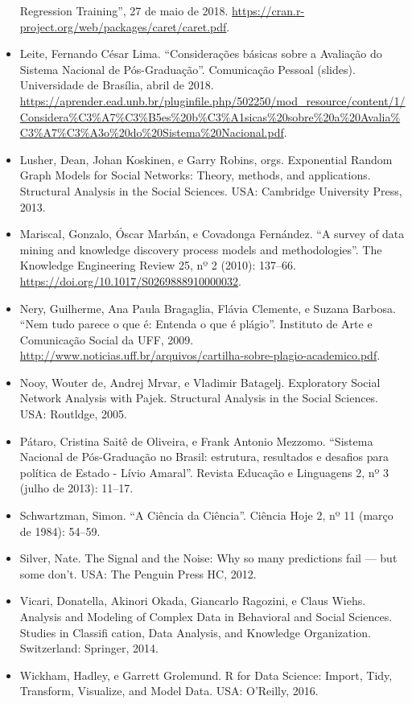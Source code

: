\documentclass[]{article}
\begin{document}
\begin{itemize}
  Regression Training'', 27 de maio de 2018.
  \url{https://cran.r-project.org/web/packages/caret/caret.pdf}.
\item
  Leite, Fernando César Lima. ``Considerações básicas sobre a Avaliação
  do Sistema Nacional de Pós-Graduação''. Comunicação Pessoal (slides).
  Universidade de Brasília, abril de 2018.
  \url{https://aprender.ead.unb.br/pluginfile.php/502250/mod_resource/content/1/Considera\%C3\%A7\%C3\%B5es\%20b\%C3\%A1sicas\%20sobre\%20a\%20Avalia\%C3\%A7\%C3\%A3o\%20do\%20Sistema\%20Nacional.pdf}.
\item
  Lusher, Dean, Johan Koskinen, e Garry Robins, orgs. Exponential Random
  Graph Models for Social Networks: Theory, methods, and applications.
  Structural Analysis in the Social Sciences. USA: Cambridge University
  Press, 2013.
\item
  Mariscal, Gonzalo, Óscar Marbán, e Covadonga Fernández. ``A survey of
  data mining and knowledge discovery process models and
  methodologies''. The Knowledge Engineering Review 25, nº 2 (2010):
  137--66. \url{https://doi.org/10.1017/S0269888910000032}.
\item
  Nery, Guilherme, Ana Paula Bragaglia, Flávia Clemente, e Suzana
  Barbosa. ``Nem tudo parece o que é: Entenda o que é plágio''.
  Instituto de Arte e Comunicação Social da UFF, 2009.
  \url{http://www.noticias.uff.br/arquivos/cartilha-sobre-plagio-academico.pdf}.
\item
  Nooy, Wouter de, Andrej Mrvar, e Vladimir Batagelj. Exploratory Social
  Network Analysis with Pajek. Structural Analysis in the Social
  Sciences. USA: Routldge, 2005.
\item
  Pátaro, Cristina Saitê de Oliveira, e Frank Antonio Mezzomo. ``Sistema
  Nacional de Pós-Graduação no Brasil: estrutura, resultados e desafios
  para política de Estado - Lívio Amaral''. Revista Educação e
  Linguagens 2, nº 3 (julho de 2013): 11--17.
\item
  Schwartzman, Simon. ``A Ciência da Ciência''. Ciência Hoje 2, nº 11
  (março de 1984): 54--59.
\item
  Silver, Nate. The Signal and the Noise: Why so many predictions fail
  --- but some don't. USA: The Penguin Press HC, 2012.
\item
  Vicari, Donatella, Akinori Okada, Giancarlo Ragozini, e Claus Wiehs.
  Analysis and Modeling of Complex Data in Behavioral and Social
  Sciences. Studies in Classifi cation, Data Analysis, and Knowledge
  Organization. Switzerland: Springer, 2014.
\item
  Wickham, Hadley, e Garrett Grolemund. R for Data Science: Import,
  Tidy, Transform, Visualize, and Model Data. USA: O'Reilly, 2016.
\end{itemize}
\end{document}
